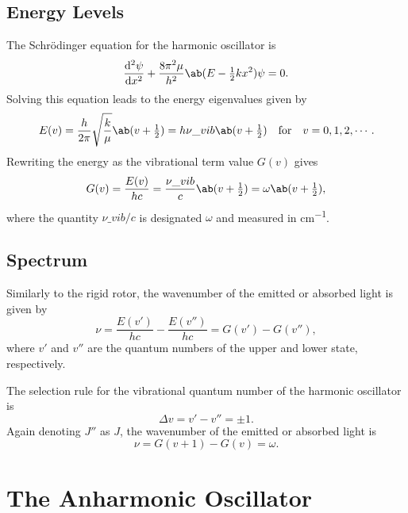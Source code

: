 \subsection{Energy Levels}

The Schr\"odinger equation for the harmonic oscillator is
\begin{equation*}
    \odv[2]{\psi}{x} + \frac{8\pi^2\mu}{h^2}\ab(E - \tfrac{1}{2}kx^2)\psi = 0.
\end{equation*}
Solving this equation leads to the energy eigenvalues given by
\begin{equation*}
    E(v) = \frac{h}{2\pi}\sqrt{\frac{k}{\mu}}\ab(v + \tfrac{1}{2}) = h\nu\_{vib}\ab(v + \tfrac{1}{2}) \quad\text{for}\quad v = 0, 1, 2, \dotsb.
\end{equation*}
Rewriting the energy as the vibrational term value $G(v)$ gives
\begin{equation*}
    G(v) = \frac{E(v)}{hc} = \frac{\nu\_{vib}}{c}\ab(v + \tfrac{1}{2}) = \omega\ab(v + \tfrac{1}{2}),
\end{equation*}
where the quantity $\nu\_{vib}/c$ is designated $\omega$ and measured in \unit{cm^{-1}}.

\subsection{Spectrum}

Similarly to the rigid rotor, the wavenumber of the emitted or absorbed light is given by
\begin{equation*}
    \nu = \frac{E(v')}{hc} - \frac{E(v'')}{hc} = G(v') - G(v''),
\end{equation*}
where $v'$ and $v''$ are the quantum numbers of the upper and lower state, respectively.

The selection rule for the vibrational quantum number of the harmonic oscillator is
\begin{equation*}
    \Delta{}v = v' - v'' = \pm 1.
\end{equation*}
Again denoting $J''$ as $J$, the wavenumber of the emitted or absorbed light is
\begin{equation*}
    \nu = G(v + 1) - G(v) = \omega.
\end{equation*}

\section{The Anharmonic Oscillator}
\label{s:the_anharmonic_oscillator}

